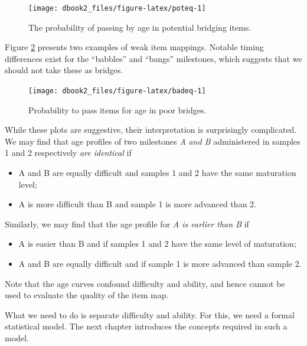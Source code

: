 \documentclass[
]{book}
\providecommand{\tightlist}{%
  \setlength{\itemsep}{0pt}\setlength{\parskip}{0pt}}
\begin{document}
\begin{figure}

{\centering \texttt{[image: dbook2\_files/figure-latex/poteq-1]} 

}

\caption{The probability of passing by age in potential bridging items.}\label{fig:poteq}
\end{figure}



Figure \ref{fig:badeq} presents two examples of weak item mappings. Notable timing differences exist for the ``babbles'' and ``bangs'' milestones, which suggests that we should not take these as bridges.

\begin{figure}

{\centering \texttt{[image: dbook2\_files/figure-latex/badeq-1]} 

}

\caption{Probability to pass items for age in poor bridges.}\label{fig:badeq}
\end{figure}



While these plots are suggestive, their interpretation is surprisingly complicated. We may find that age profiles of two milestones \emph{A and B} administered in samples 1 and 2 respectively \emph{are identical} if

\begin{itemize}
\tightlist
\item
  A and B are equally difficult and samples 1 and 2 have the same maturation level;
\item
  A is more difficult than B and sample 1 is more advanced than 2.
\end{itemize}

Similarly, we may find that the age profile for \emph{A is earlier than B} if

\begin{itemize}
\tightlist
\item
  A is easier than B and if samples 1 and 2 have the same level of maturation;
\item
  A and B are equally difficult and if sample 1 is more advanced than sample 2.
\end{itemize}

Note that the age curves confound difficulty and ability, and hence cannot be used to evaluate the quality of the item map.

What we need to do is separate difficulty and ability. For this, we need a formal statistical model. The next chapter introduces the concepts required in such a model.
\end{document}
